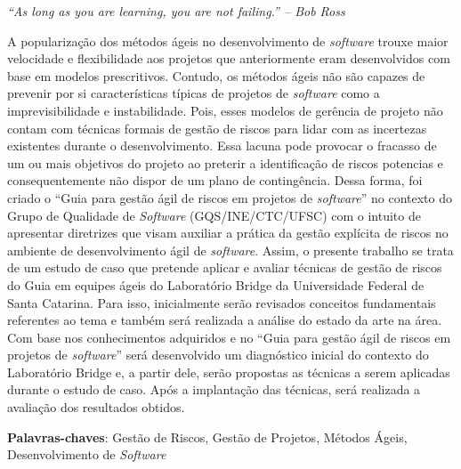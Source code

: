 \documentclass[
    12pt,       %
    openright,      %
    twoside,      %
    a4paper,      %
    english,      %
    french,       %
    spanish,      %
    brazil,       %
    ]{abntex2}
\begin{document}
  \begin{agradecimentos}
  \end{agradecimentos}

  \begin{epigrafe}
      \vspace*{\fill}
    \begin{flushright}
      \textit{“As long as you are learning, you are not failing.” – Bob Ross}
    \end{flushright}
  \end{epigrafe}


  \begin{resumo}
    A popularização dos métodos ágeis no desenvolvimento de \textit{\textit{software}} trouxe maior velocidade e flexibilidade aos projetos que anteriormente eram desenvolvidos com base em modelos prescritivos. Contudo, os métodos ágeis não são capazes de prevenir por si características típicas de projetos de \textit{software} como a imprevisibilidade e instabilidade. Pois, esses modelos de gerência de projeto não contam com técnicas formais de gestão de riscos para lidar com as incertezas existentes durante o desenvolvimento. Essa lacuna pode provocar o fracasso de um ou mais objetivos do projeto ao preterir a identificação de riscos potencias e consequentemente não dispor de um plano de contingência. Dessa forma, foi criado o “Guia para gestão ágil de riscos em projetos de \textit{software}” no contexto do Grupo de Qualidade de \textit{Software} (GQS/INE/CTC/UFSC) com o intuito de apresentar diretrizes que visam auxiliar a prática da gestão explícita de riscos no ambiente de desenvolvimento ágil de \textit{software}. Assim, o presente trabalho se trata de um estudo de caso que pretende aplicar e avaliar técnicas de gestão de riscos do Guia em equipes ágeis do Laboratório Bridge da Universidade Federal de Santa Catarina. Para isso, inicialmente serão revisados conceitos fundamentais referentes ao tema e também será realizada a análise do estado da arte na área. Com base nos conhecimentos adquiridos e no “Guia para gestão ágil de riscos em projetos de \textit{software}” será desenvolvido um diagnóstico inicial do contexto do Laboratório Bridge e, a partir dele, serão propostas as técnicas a serem aplicadas durante o estudo de caso. Após a implantação das técnicas, será realizada a avaliação dos resultados obtidos.
   \vspace{\onelineskip}

   \noindent
   \textbf{Palavras-chaves}: Gestão de Riscos, Gestão de Projetos, Métodos Ágeis, Desenvolvimento de \textit{Software}
  \end{resumo}
\end{document}
